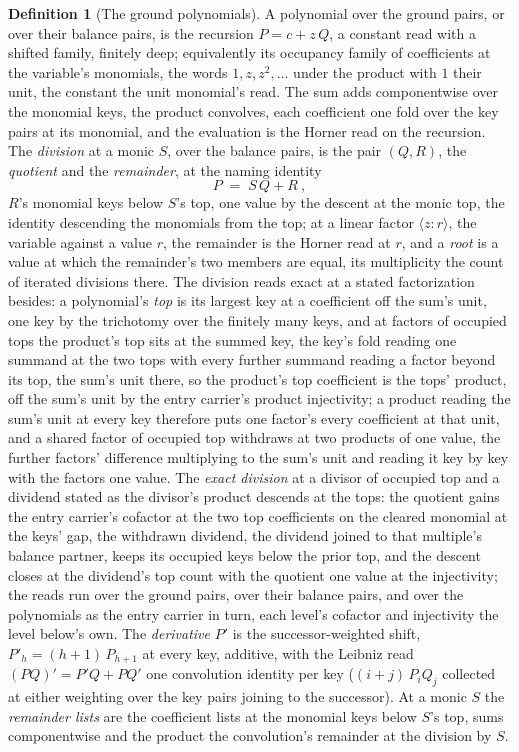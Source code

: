 \documentclass[11pt]{article}
\theoremstyle{definition}
\newtheorem{definition}{Definition}
\begin{document}
\begin{definition}[The ground polynomials]\label{def:poly}
A polynomial over the ground pairs, or over their balance pairs,
is the recursion $P=c+z\,Q$, a constant read with a shifted
family, finitely deep; equivalently its occupancy family of
coefficients at the variable's monomials, the words
$1,z,z^2,\dots$ under the product with $1$ their unit, the
constant the unit monomial's read. The sum adds componentwise
over the monomial keys, the product convolves, each
coefficient one fold over the key pairs at its
monomial, and the evaluation is the Horner read on the recursion.
The \emph{division} at a monic $S$, over the balance pairs,
is the pair $(Q,R)$, the \emph{quotient} and the \emph{remainder},
at the naming identity
\[
P\;=\;S\,Q+R\ ,
\]
$R$'s monomial keys below $S$'s top, one value by the descent
at the monic top, the identity descending the monomials from the
top; at a
linear factor $\langle z\!:\!r\rangle$, the variable against a
value $r$, the remainder is the Horner read at $r$, and a
\emph{root} is a value at which the remainder's two members are
equal, its multiplicity
the count of iterated divisions there. The division reads exact at
a stated factorization besides: a polynomial's \emph{top} is its
largest key at a coefficient off the sum's unit, one key by the
trichotomy over the finitely many keys, and at factors of occupied
tops the product's top sits at the summed key, the key's fold
reading one summand at the two tops with every further summand
reading a factor beyond its top, the sum's unit there, so the
product's top coefficient is the tops' product, off the sum's unit
by the entry carrier's product injectivity; a product reading the
sum's unit at every key therefore puts one factor's every
coefficient at that unit, and a shared factor of occupied top
withdraws at two products of one value, the further factors'
difference multiplying to the sum's unit and reading it key by key
with the factors one value. The \emph{exact division} at a divisor
of occupied top and a dividend stated as the divisor's product
descends at the tops: the quotient gains the entry carrier's
cofactor at the two top coefficients on the cleared monomial at
the keys' gap, the withdrawn dividend, the dividend joined to that
multiple's balance partner, keeps its occupied keys below the
prior top, and the descent closes at the dividend's top count with
the quotient one value at the injectivity; the reads run over the
ground pairs, over their balance pairs, and over the polynomials
as the entry carrier in turn, each level's cofactor and
injectivity the level below's own. The \emph{derivative} $P'$ is the
successor-weighted shift, $P'_h=(h+1)\,P_{h+1}$ at every key,
additive, with the Leibniz read $(PQ)'=P'Q+PQ'$ one convolution
identity per key ($(i+j)\,P_iQ_j$ collected at either weighting
over the key pairs joining to the successor). At a monic $S$ the
\emph{remainder lists} are the coefficient lists at the monomial
keys below $S$'s top, sums componentwise and the product the
convolution's remainder at the division by $S$.
\end{definition}
\end{document}
